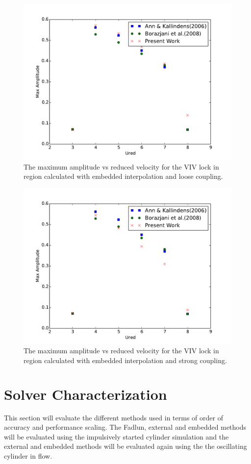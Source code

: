 \documentclass[onehalf,11pt]{beavtex}
\begin{document}
\begin{figure}
	\centering
	\includegraphics[width=\textwidth]{vivemlc}
	\caption{The maximum amplitude vs reduced velocity for the VIV lock in region calculated with embedded interpolation and loose coupling.}
	\label{fig:viv3}
\end{figure}
\begin{figure}
	\centering
	\includegraphics[width=\textwidth]{vivemsc}
	\caption{The maximum amplitude vs reduced velocity for the VIV lock in region calculated with embedded interpolation and strong coupling.}
	\label{fig:viv4}
\end{figure}

\chapter{Solver Characterization}
\label{chapter:error}
This section will evaluate the different methods used in terms of order of accuracy and performance scaling. 
The Fadlun, external and embedded methods will be evaluated using the impulsively started cylinder simulation and the external and embedded methods will be evaluated again using the the oscillating cylinder in flow.
\end{document}
